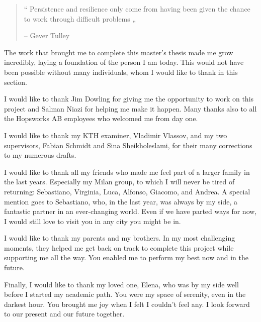 
\begin{quote}
    “ Persistence and resilience only come from having been given the chance to work through difficult problems „

    -- Gever Tulley
\end{quote}
The work that brought me to complete this master's thesis made me grow incredibly, laying a foundation of the person I am today. This would not have been possible without many individuals, whom I would like to thank in this section.

I would like to thank Jim Dowling for giving me the opportunity to work on this project and Salman Niazi for helping me make it happen. Many thanks also to all the Hopsworks AB employees who welcomed me from day one.

I would like to thank my KTH examiner, Vladimir Vlassov, and my two supervisors, Fabian Schmidt and Sina Sheikholeslami, for their many corrections to my numerous drafts.

I would like to thank all my friends who made me feel part of a larger family in the last years. Especially my Milan group, to which I will never be tired of returning: Sebastiano, Virginia, Luca, Alfonso, Giacomo, and Andrea. A special mention goes to Sebastiano, who, in the last year, was always by my side, a fantastic partner in an ever-changing world. Even if we have parted ways for now, I would still love to visit you in any city you might be in.

I would like to thank my parents and my brothers. In my most challenging moments, they helped me get back on track to complete this project while supporting me all the way. You enabled me to perform my best now and in the future.

Finally, I would like to thank my loved one, Elena, who was by my side well before I started my academic path. You were my space of serenity, even in the darkest hour. You brought me joy when I felt I couldn't feel any. I look forward to our present and our future together.
